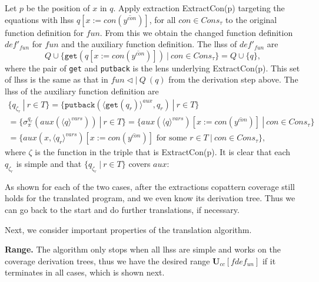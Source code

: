 \begin{algorithm}
\begin{enumerate}
Let $p$ be the position of $x$ in $q$. Apply extraction \textsf{ExtractCon}(p) targeting the equations with lhss $q[x := con(\overline{y^{con}})]$, for all $con \in Cons_\tau$ to the original function definition for $fun$. From this we obtain the changed function definition $def'_{fun}$ for $fun$ and the auxiliary function definition. The lhss of $def'_{fun}$ are
\[
Q \cup \{ \texttt{get}(q[x := con(\overline{y^{con}})]) ~ | ~ con \in Cons_\tau \} = Q \cup \{q\},
\]
where the pair of \texttt{get} and \texttt{putback} is the lens underlying \textsf{ExtractCon}(p). This set of lhss is the same as that in $fun \lhd | ~ Q ~ (q)$ from the derivation step above. The lhss of the auxiliary function definition are
\begin{multline*}
\{ q_{\zeta_r} ~ | ~ r \in T \} = \{ \texttt{putback}(\langle \texttt{get}(q_r) \rangle^{aux}, q_r) ~ | ~ r \in T \} \\
= \{ \sigma^{q_r}_\pi(aux(\langle q \rangle^{vars})) ~ | ~ r \in T \} = \{ aux(\langle q \rangle^{vars})[x := con(\overline{y^{con}})] ~ | ~ con \in Cons_\tau \} \\
= \{ aux(x, \langle q_r \rangle^{vars})[x := con(\overline{y^{con}})] \text{ for some } r \in T ~ | ~ con \in Cons_\tau \},
\end{multline*}
where $\zeta$ is the function in the triple that is \textsf{ExtractCon}(p). It is clear that each $q_{\zeta_r}$ is simple and that $\{ q_{\zeta_r} ~ | ~ r \in T \}$ covers $aux$:
\begin{prooftree}
\AxiomC{}
\end{prooftree}
\end{enumerate}

As shown for each of the two cases, after the extractions copattern coverage still holds for the translated program, and we even know its derivation tree. Thus we can go back to the start and do further translations, if necessary.
\end{algorithm}

Next, we consider important properties of the translation algorithm.

\textbf{Range.} The algorithm only stops when all lhss are simple and works on the coverage derivation trees, thus we have the desired range $\mathbf{U}_{cc}[fdef_{un}]$ if it terminates in all cases, which is shown next.

